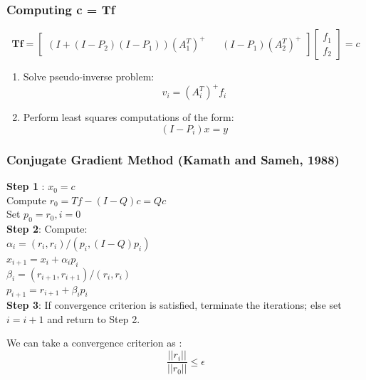 \documentclass{beamer}
\begin{document}
\begin{frame}
\frametitle{Computing c = Tf}

$$\textbf{Tf} = \begin{bmatrix} (I + (I-P_2)(I-P_1))(A_1^T)^+ && (I-P_1)(A_2^T)^+ \end{bmatrix} \begin{bmatrix} f_1  \\ f_2 \end{bmatrix}= c $$

\begin{enumerate}
\item Solve pseudo-inverse problem:
$$v_i = (A_i^T)^+f_i$$
\item Perform least squares computations of the form:
$$ (I-P_i) x =  y$$
\end{enumerate}
\end{frame}






\begin{frame}
\frametitle{Conjugate Gradient Method (Kamath and Sameh, 1988) }
\textbf{Step 1} : $x_0 = c$ \\
\hspace{.5in} Compute $r_0 = Tf - (I-Q)c = Qc$\\
\hspace{.5in} Set $p_0 = r_0, i = 0$ \\
\textbf{Step 2}:  Compute: \\
\hspace{.5in} $\alpha_i = (r_i, r_i)/(p_i, (I-Q)p_i)$ \\
\hspace{.5in} $ x_{i+1} = x_i + \alpha_i p_i $ \\
\hspace{.5in} $\beta_i = (r_{i+1}, r_{i+1})/(r_i, r_i) $ \\
\hspace{.5in} $p_{i+1} = r_{i+1} + \beta_i p _i $ \\
\textbf{Step 3}: If convergence criterion is satisfied, terminate the iterations; else set $i = i+1$ and return to Step 2.

\vspace{.4in}
 We can take a convergence criterion as : $$ \frac{ ||r_i||}{||r_0||} \leq \epsilon$$
\end{frame}
\end{document}
